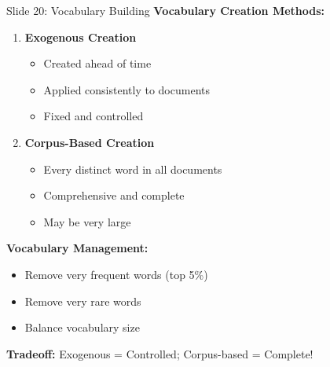 \documentclass[8pt]{beamer}
\begin{document}
	\begin{frame}{Slide 20: Vocabulary Building}
		\fontsize{6.5}{7.5}\selectfont
		\textbf{Vocabulary Creation Methods:}
		\begin{enumerate}
			\item \textbf{Exogenous Creation}
			\begin{itemize}
				\item Created ahead of time
				\item Applied consistently to documents
				\item Fixed and controlled
			\end{itemize}
			\item \textbf{Corpus-Based Creation}
			\begin{itemize}
				\item Every distinct word in all documents
				\item Comprehensive and complete
				\item May be very large
			\end{itemize}
		\end{enumerate}
		
		\vspace{0.1cm}
		\textbf{Vocabulary Management:}
		\begin{itemize}
			\item Remove very frequent words (top 5\%)
			\item Remove very rare words
			\item Balance vocabulary size
		\end{itemize}
		
		\textcolor{myblue}{\textbf{Tradeoff:}} Exogenous = Controlled; Corpus-based = Complete!
	\end{frame}
	
\end{document}

